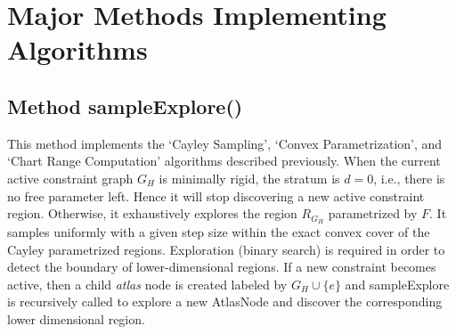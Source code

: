 \section{Major Methods Implementing Algorithms}
\label{sec:pseudocode}

\subsection{Method sampleExplore()} %
\label{sec:sampleExplore}
This method implements the `Cayley Sampling', `Convex Parametrization', and `Chart Range Computation'
algorithms described previously. When the current active constraint graph $G_H$
is minimally rigid, the stratum is $d=0$, i.e., there is no free parameter
left. Hence it will stop discovering a new active constraint region.
Otherwise, it exhaustively explores the region $R_{G_H}$ parametrized by $F$.
It samples uniformly with a given step size within the exact convex cover of the
Cayley parametrized regions. Exploration (binary search) is required in order
to detect the boundary of lower-dimensional regions. If a new constraint
becomes active, then a child \textit{atlas} node is created labeled
by $G_H \cup \{e\}$ and sampleExplore is recursively called to explore a new
AtlasNode and discover the corresponding lower dimensional region.\\


